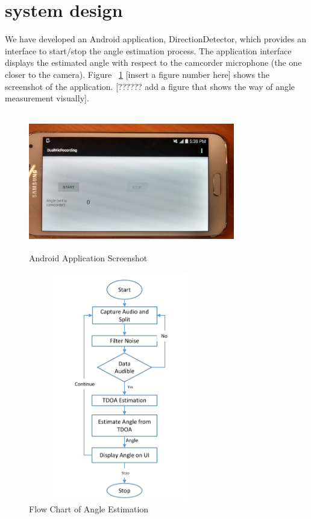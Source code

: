 \section{system design}
We have developed an Android application, DirectionDetector, which provides an interface to start/stop the angle estimation process. The application interface displays the estimated angle with respect to the camcorder microphone (the one closer to the camera). Figure ~\ref{fig:screenshot} [insert a figure number here] shows the screenshot of the application. [?????? add a figure that shows the way of angle measurement visually].

\begin{figure}
\includegraphics[width=90mm, height=60mm]{figures/screenshot.jpg}
\caption{Android Application Screenshot}
\label{fig:screenshot}
\end{figure}


\begin{figure}
\includegraphics[width=80mm, height=100mm]{figures/flowchart.pdf}
%
\caption{Flow Chart of Angle Estimation}
\label{fig:flowChart}
\end{figure}

